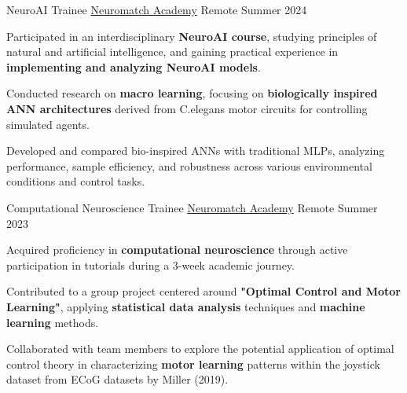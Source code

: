 

\begin{cventries}

\cventry
  {NeuroAI Trainee} %
    {\href{https://neuromatch.io/}{Neuromatch Academy}} %
    {Remote} %
    {Summer 2024} %
    {
      \begin{cvitems} %
        \item {Participated in an interdisciplinary {\textbf{NeuroAI course}}, studying principles of natural and artificial intelligence, and gaining practical experience in {\textbf{implementing and analyzing NeuroAI models}}.}
        \item {Conducted research on {\textbf{macro learning}}, focusing on {\textbf{biologically inspired ANN architectures}} derived from C.elegans motor circuits for controlling simulated agents.}
        \item {Developed and compared bio-inspired ANNs with traditional MLPs, analyzing performance, sample efficiency, and robustness across various environmental conditions and control tasks.}
      \end{cvitems}
    }

  \cventry
    {Computational Neuroscience Trainee} %
    {\href{https://neuromatch.io/}{Neuromatch Academy}} %
    {Remote} %
    {Summer 2023} %
    {
      \begin{cvitems} %
	\item {Acquired proficiency in {\textbf{computational neuroscience}} through active participation in tutorials during a 3-week academic journey.}
        \item {Contributed to a group project centered around {\textbf{"Optimal Control and Motor Learning"}}, applying {\textbf{statistical data analysis}} techniques and {\textbf{machine learning}} methods.}
        \item {Collaborated with team members to explore the potential application of optimal control theory in characterizing {\textbf{motor learning}} patterns within the joystick dataset from ECoG datasets by Miller (2019).}
      \end{cvitems}
    }


\end{cventries}
